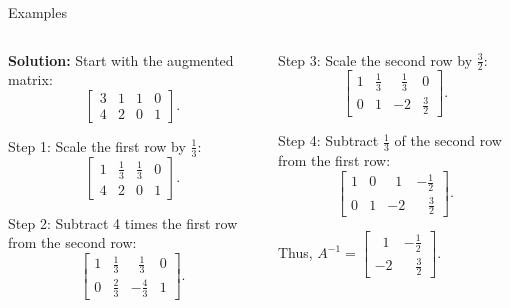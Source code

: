 \documentclass[10pt, aspectratio=169]{beamer}
\begin{document}
\begin{frame}{Examples}
{\begin{columns}
\begin{column}{0.5\textwidth}
\textbf{Solution:} Start with the augmented matrix:
\[
\left[\begin{array}{cc|cc}
3 & 1 & 1 & 0 \\
4 & 2 & 0 & 1
\end{array}\right].
\]

Step 1: Scale the first row by \(\frac{1}{3}\):
\[
\left[\begin{array}{cc|cc}
1 & \frac{1}{3} & \frac{1}{3} & 0 \\
4 & 2 & 0 & 1
\end{array}\right].
\]

Step 2: Subtract 4 times the first row from the second row:
\[
\left[\begin{array}{cc|cc}
1 & \frac{1}{3} & \;\;\frac{1}{3} & 0 \\
0 & \frac{2}{3} & -\frac{4}{3} & 1
\end{array}\right].
\]
\end{column}

\begin{column}{0.5\textwidth}
Step 3: Scale the second row by \(\frac{3}{2}\):
\[
\left[\begin{array}{cc|cc}
1 & \frac{1}{3} & \;\;\frac{1}{3} & 0 \\
0 & 1 & -2 & \frac{3}{2}
\end{array}\right].
\]

Step 4: Subtract \(\frac{1}{3}\) of the second row from the first row:
\[
\left[\begin{array}{cc|cc}
1 & 0 & \;\;1 & -\frac{1}{2} \\
0 & 1 & -2 & \;\;\;\frac{3}{2}
\end{array}\right].
\]

Thus, \(A^{-1} = \begin{bmatrix} \;\;1 & -\frac{1}{2} \\ -2 & \;\;\;\frac{3}{2} \end{bmatrix}\).

\end{column}
\end{columns}
}

\end{frame}
\end{document}
